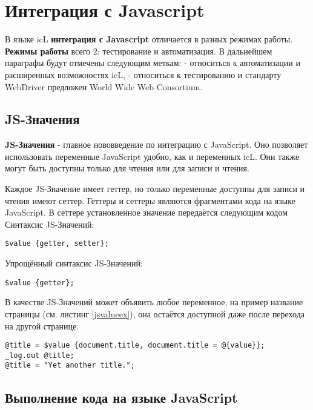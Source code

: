 \documentclass[a4paper, 14pt]{extarticle}
\begin{document}
\section{Интеграция с Javascript}

В языке icL {\bf интеграция с Javascript} отличается в разных режимах работы. {\bf Режимы работы} всего 2: тестирование и автоматизация. В дальнейшем параграфы будут отмечены следующим меткам: \code{[icL]} - относиться к автоматизации и расширенных возможностях icL, \code{[w3c]} - относиться к тестированию и стандарту WebDriver предложен World Wide Web Consortium.

\subsection{JS-Значения}

{\bf JS-Значения} - главное нововведение по интеграцию с JavaScript. Оно позволяет использовать переменные JavaScript удобно, как и переменных icL. Они также могут быть доступны только для чтения или для записи и чтения.

Каждое JS-Значение имеет геттер, но только переменные доступны для записи и чтения имеют сеттер. Геттеры и сеттеры являются фрагментами кода на языке JavaScript. В сеттере установленное значение передаётся следующим кодом  Синтаксис JS-Значений:
\begin{lstlisting}[numbers=none]
$value {getter, setter};
\end{lstlisting}

Упрощённый синтаксис JS-Значений:
\begin{lstlisting}[numbers=none]
$value {getter};
\end{lstlisting}

В качестве JS-Значений может объявить любое переменное, на пример название страницы (см. листинг \ref{jsvalueex}), она остаётся доступной даже после перехода на другой странице.

\begin{lstlisting}[caption=Использование JS-Значений, label=jsvalueex]
@title = $value {document.title, document.title = @{value}};
_log.out @title;
@title = "Yet another title.";
\end{lstlisting}

\subsection{Выполнение кода на языке JavaScript}
\end{document}
